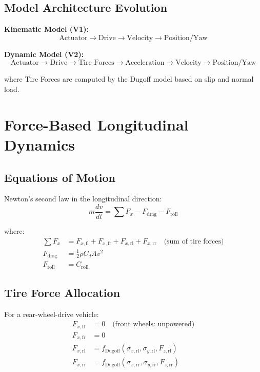 \documentclass[11pt,a4paper]{article}
\begin{document}
\subsection{Model Architecture Evolution}

\textbf{Kinematic Model (V1):}
\begin{equation}
\text{Actuator} \to \text{Drive} \to \text{Velocity} \to \text{Position/Yaw}
\end{equation}

\textbf{Dynamic Model (V2):}
\begin{equation}
\text{Actuator} \to \text{Drive} \to \boxed{\text{Tire Forces}} \to \text{Acceleration} \to \text{Velocity} \to \text{Position/Yaw}
\end{equation}

where Tire Forces are computed by the Dugoff model based on slip and normal load.

\section{Force-Based Longitudinal Dynamics}

\subsection{Equations of Motion}

Newton's second law in the longitudinal direction:
\begin{equation}
m \frac{dv}{dt} = \sum F_x - F_{\text{drag}} - F_{\text{roll}}
\end{equation}

where:
\begin{align}
\sum F_x &= F_{x,\text{fl}} + F_{x,\text{fr}} + F_{x,\text{rl}} + F_{x,\text{rr}} \quad \text{(sum of tire forces)} \\
F_{\text{drag}} &= \frac{1}{2} \rho C_d A v^2 \\
F_{\text{roll}} &= C_{\text{roll}}
\end{align}

\subsection{Tire Force Allocation}

For a rear-wheel-drive vehicle:
\begin{align}
F_{x,\text{fl}} &= 0 \quad \text{(front wheels: unpowered)} \\
F_{x,\text{fr}} &= 0 \\
F_{x,\text{rl}} &= f_{\text{Dugoff}}(\sigma_{x,\text{rl}}, \sigma_{y,\text{rl}}, F_{z,\text{rl}}) \\
F_{x,\text{rr}} &= f_{\text{Dugoff}}(\sigma_{x,\text{rr}}, \sigma_{y,\text{rr}}, F_{z,\text{rr}})
\end{align}
\end{document}
